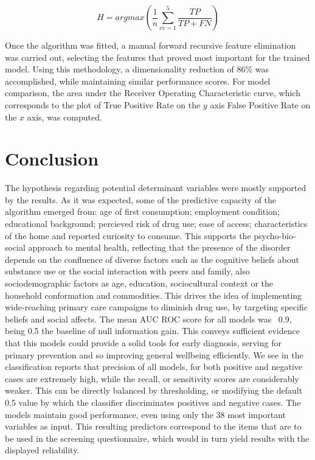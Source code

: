 \documentclass[8pt]{article}
\begin{document}
{\begin{multicols}{2}
\begin{equation*}
H = argmax(\frac{1}{n}\sum_{cv = 1}^{5}\frac{TP}{TP + FN})
\end{equation*}

Once the algorithm was fitted, a manual forward recursive feature elimination was carried out, selecting the features that proved most important for the trained model. Using this methodology, a dimensionality reduction of 86\% was accomplished, while maintaining similar performance scores. For model comparison, the area under the Receiver Operating Characteristic curve, which corresponds to the plot of True Positive Rate on the $y$ axis False Positive Rate on the $x$ axis, was computed.  

\section{Conclusion}

The hypothesis regarding potential determinant variables were mostly supported by the results. As it was expected, some of the predictive capacity of the algorithm emerged from: age of first consumption; employment condition; educational background; percieved risk of drug use; ease of access; characteristics of the home and reported curiosity to consume. This supports the psycho-bio-social approach to mental health, reflecting that the presence of the disorder depends on the confluence of diverse factors such as the cognitive beliefs about substance use or the social interaction with peers and family, also sociodemographic factors as age, education, sociocultural context or the household conformation and commodities. This drives the idea of implementing wide-reaching primary care campaigns to diminish drug use, by targeting specific beliefs and social affects.
The mean AUC ROC score for all models was ~0.9, being 0.5 the baseline of null information gain. This conveys sufficient evidence that this models could provide a solid tools for early diagnosis, serving for primary prevention and so improving general wellbeing efficiently. We see in the classification reports that precision of all models, for both positive and negative cases are extremely high, while the recall, or sensitivity scores are considerably weaker. This can be directly balanced by thresholding, or modifying the default 0.5 value by which the classifier discriminates positives and negative cases. 
The models maintain good performance, even using only the 38 most important variables as input. This resulting predictors correspond to the items that are to be used in the screening questionnaire, which would in turn yield results with the displayed reliability. 


\end{multicols}}
\end{document}
